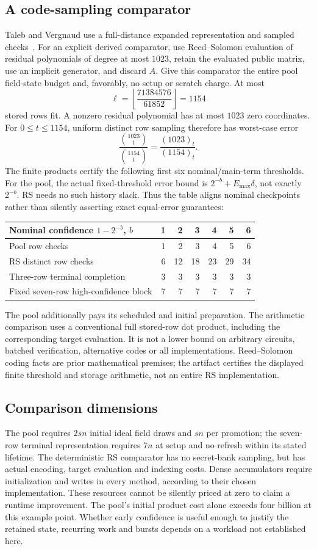 \documentclass[11pt,letterpaper]{article}
\theoremstyle{definition}
\newcommand{\Emax}{E_{\max}}
\newcommand{\fall}[2]{(#1)_{#2}}
\begin{document}
\subsection{A code-sampling comparator}
Taleb and Vergnaud use a full-distance expanded representation and sampled checks~\cite{tv}. For an explicit derived comparator, use Reed--Solomon evaluation of residual polynomials of degree at most $1023$, retain the evaluated public matrix, use an implicit generator, and discard $A$. Give this comparator the entire pool field-state budget and, favorably, no setup or scratch charge. At most
\[
 \ell=\left\lfloor\frac{71384576}{61852}\right\rfloor=1154
\]
stored rows fit. A nonzero residual polynomial has at most $1023$ zero coordinates. For $0\le t\le1154$, uniform distinct row sampling therefore has worst-case error
\[
 \frac{\binom{1023}{t}}{\binom{1154}{t}}
 =\frac{\fall{1023}{t}}{\fall{1154}{t}}.
\]
The finite products certify the following first six nominal/main-term thresholds. For the pool, the actual fixed-threshold error bound is $2^{-b}+\Emax\delta$, not exactly $2^{-b}$. RS needs no such history slack. Thus the table aligns nominal checkpoints rather than silently asserting exact equal-error guarantees:
\begin{center}
\begin{tabular}{@{}lrrrrrr@{}}
\toprule
Nominal confidence $1-2^{-b}$, $b$ & 1&2&3&4&5&6\\
\midrule
Pool row checks &1&2&3&4&5&6\\
RS distinct row checks &6&12&18&23&29&34\\
Three-row terminal completion &3&3&3&3&3&3\\
Fixed seven-row high-confidence block &7&7&7&7&7&7\\
\bottomrule
\end{tabular}
\end{center}
The pool additionally pays its scheduled and initial preparation. The arithmetic comparison uses a conventional full stored-row dot product, including the corresponding target evaluation. It is not a lower bound on arbitrary circuits, batched verification, alternative codes or all implementations. Reed--Solomon coding facts are prior mathematical premises; the artifact certifies the displayed finite threshold and storage arithmetic, not an entire RS implementation.

\subsection{Comparison dimensions}
The pool requires $2sn$ initial ideal field draws and $sn$ per promotion; the seven-row terminal representation requires $7n$ at setup and no refresh within its stated lifetime. The deterministic RS comparator has no secret-bank sampling, but has actual encoding, target evaluation and indexing costs. Dense accumulators require initialization and writes in every method, according to their chosen implementation. These resources cannot be silently priced at zero to claim a runtime improvement. The pool's initial product cost alone exceeds four billion at this example point. Whether early confidence is useful enough to justify the retained state, recurring work and bursts depends on a workload not established here.
\end{document}
